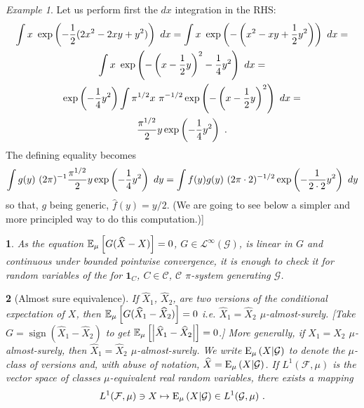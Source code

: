 \documentclass[12pt,a4paper]{amsart}
\newcommand{\one}{\bm 1}
\newcommand{\signof}[1]{\operatorname{sign}\left(#1\right)}
\theoremstyle{plain}%
\newtheorem{npar}{}%
\theoremstyle{definition}
\theoremstyle{remark}
\newtheorem{example}{Example}
\begin{document}
\begin{example}
Let us perform first the $dx$ integration in the RHS:
\begin{multline*}
  \int x \ \expof{-\frac12(2x^2 - 2xy + y^2)} \ dx =  \int x \ \expof{-\left(x^2 - xy + \frac12 y^2\right)} \ dx = \\  \int x \ \expof{-\left(x-\frac12 y\right)^2 - \frac14 y^2} \ dx = \\ \expof{-\frac14 y^2} \int \pi^{1/2} x \ \pi^{-1/2}\expof{-\left(x-\frac12 y\right)^2} \ dx = \\
 \frac {\pi^{1/2}}2 y \expof{-\frac14 y^2} \ . 
\end{multline*}
The defining equality becomes
\begin{equation*}
    \int g(y) \ (2\pi)^{-1} \frac {\pi^{1/2}}2 y \exp\left(-\frac14 y^2\right) \ dy = \int f(y)g(y) \ (2\pi \cdot 2)^{-1/2} \exp\left(-\frac 1 {2 \cdot 2} y^2\right) \ dy 
\end{equation*}
so that, $g$ being generic, $\hat f(y) = y/2$. (We are going to see below a simpler and more principled way to do this computation.)]
\end{example}

\begin{npar} \normalfont
As the equation $\operatorname{\mathbb E}_{\mu}\left[G(\widehat X - X)\right] = 0$, $G \in \mathcal L^\infty(\mathcal G)$, is linear in $G$ and continuous under bounded pointwise convergence, it is enough to check it for random variables of the for $\one_C$, $C \in \mathcal C$, $\mathcal C$ $\pi$-system generating $\mathcal G$.
\end{npar}

\begin{npar}[Almost sure equivalence] \normalfont If $\widehat X_1$, $\widehat X_2$, are two versions of the conditional expectation of $X$, then $\operatorname{\mathbb E}_{\mu}\left[G(\widehat X_1 - \widehat X_2)\right] = 0$ i.e. $\widehat X_1 = \widehat X_2$ $\mu$-almost-surely. [Take $G = \signof{\widehat X_1 - \widehat X_2}$ to get $\operatorname{\mathbb E}_{\mu}\left[\left\vert\widehat X_1 - \widehat X_2\right\vert\right] = 0$.] More generally, if $X_1 = X_2$ $\mu$-almost-surely, then $\widehat X_1 = \widehat X_2$ $\mu$-almost-surely. We write $\operatorname{E}_{\mu}\left(X \middle| \mathcal G\right)$ to denote the $\mu$-class of versions and, with abuse of notation, $\widehat X = \operatorname{E}_{\mu}\left(X \middle| \mathcal G\right)$. If $L^1(\mathcal F,\mu)$ is the vector space of classes $\mu$-equivalent real random variables, there exists a mapping
\begin{equation*}
  L^1(\mathcal F,\mu) \ni X \mapsto \operatorname{E}_{\mu}\left(X \middle| \mathcal G\right) \in L^1(\mathcal G,\mu) \ .
\end{equation*}
\end{npar}
\end{document}
